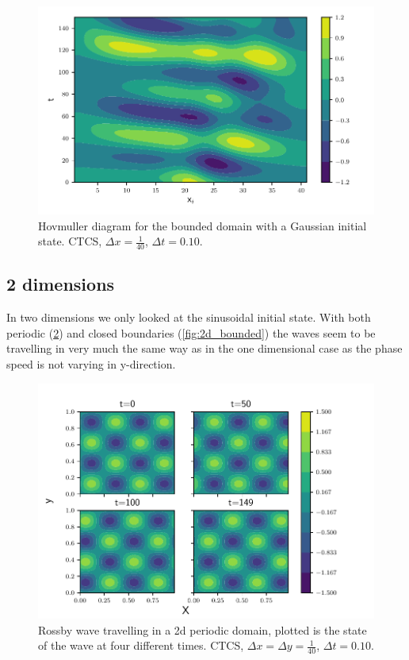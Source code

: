 \begin{figure}[H]
  \centering
  \includegraphics[width=\textwidth]{../figures/psi_bounded_centered_gauss.pdf}
  \caption{Hovmuller diagram for the bounded domain with a Gaussian initial state. CTCS, $\Delta x = \frac{1}{40}$, $\Delta t = 0.10$.}
  \label{fig:bounded_gauss}
\end{figure}


\subsection{2 dimensions}

In two dimensions we only looked at the sinusoidal initial state. With both
periodic (\cref{fig:2d_periodic}) and closed boundaries (\cref{fig:2d_bounded})
the waves seem to be travelling in very much the same way as in the one
dimensional case as the phase speed is not varying in y-direction.

\begin{figure}[H]
  \centering
  \includegraphics[width=\textwidth]{../figures/periodic_2d.pdf}
  \caption{Rossby wave travelling in a 2d periodic domain, plotted is the state of the wave at four different times. CTCS, $\Delta x = \Delta y = \frac{1}{40}$, $\Delta t = 0.10$.}
  \label{fig:2d_periodic}
\end{figure}



